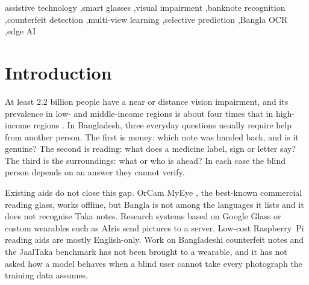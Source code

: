 \documentclass[preprint,12pt]{elsarticle}
\begin{document}
\begin{frontmatter}
\begin{abstract}
For text, region selection reduces the character error rate on a correctly shaped Bangla benchmark from 9.3\% to 2.4\%, and a blended real-word recogniser lowers Bangla error on real street words from 39.2\% to 28.7\%. A currency answer takes 327\,ms on the Pi. We report the limitations equally plainly: no evaluation yet through the glass camera, no completed user study, few counterfeit prints and synthetic voices.
\end{abstract}

\begin{keyword}
assistive technology \sep smart glasses \sep visual impairment \sep banknote recognition \sep counterfeit detection \sep multi-view learning \sep selective prediction \sep Bangla OCR \sep edge AI
\end{keyword}

\end{frontmatter}

\linenumbers

\section{Introduction}
\label{sec:intro}

At least 2.2 billion people have a near or distance vision impairment, and its prevalence in low- and middle-income regions is about four times that in high-income regions \cite{who2023vision}. In Bangladesh, three everyday questions usually require help from another person. The first is money: which note was handed back, and is it genuine? The second is reading: what does a medicine label, sign or letter say? The third is the surroundings: what or who is ahead? In each case the blind person depends on an answer they cannot verify.

Existing aids do not close this gap. OrCam MyEye \cite{orcam}, the best-known commercial reading glass, works offline, but Bangla is not among the languages it lists and it does not recognise Taka notes. Research systems based on Google Glass \cite{googleglass2021} or custom wearables such as AIris \cite{airis2024} send pictures to a server. Low-cost Raspberry~Pi reading aids \cite{readingaid_rpi2023,wearable_review2024} are mostly English-only. Work on Bangladeshi counterfeit notes \cite{uddin2016counterfeit,pathak2024counterfeit,chowdhury2022uvink} and the JaalTaka benchmark \cite{jaaltaka,piyas2026jaaltaka} has not been brought to a wearable, and it has not asked how a model behaves when a blind user cannot take every photograph the training data assumes.
\end{document}
